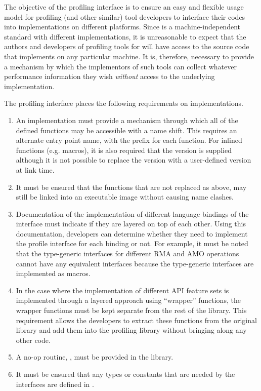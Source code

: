 The objective of the \openshmem profiling interface is to ensure an 
easy and flexible usage model for profiling (and other similar) 
tool developers to interface their codes into \openshmem 
implementations on different platforms. Since \openshmem is a 
machine-independent standard with different implementations, it is 
unreasonable to expect that the authors and developers of profiling 
tools for \openshmem will have access to the source code that 
implements \openshmem on any particular machine. It is, therefore,  
necessary to provide a mechanism by which the implementors of such 
tools can collect whatever performance information they wish 
\textit{without} access to the underlying implementation.

The \openshmem profiling interface places the following requirements 
on implementations. 

\begin{enumerate}
\item An \openshmem implementation must provide a mechanism through 
which all of the \openshmem defined functions may be accessible 
with a name shift. This requires an alternate 
entry point name, with the prefix  for each 
\openshmem function. For \openshmem inlined functions (e.g. macros), 
it is also required that the  version is supplied 
although it is not possible to replace the  version 
with a user-defined version at link time.
\item It must be ensured that the \openshmem functions that are not 
replaced as above, may still be linked into an executable image 
without causing name clashes. 
\item Documentation of the implementation of different language 
bindings of the \openshmem interface must indicate if they 
are layered on top of each other. Using this documentation,   
developers can determine whether they need to implement the 
profile interface for each binding or not. For example, it must 
be noted that the \openshmem \Cstd[11] type-generic interfaces for 
different RMA and AMO operations cannot have any equivalent 
 interfaces because the \Cstd[11] type-generic 
interfaces are implemented as macros.
\item In the case where the implementation of different API  
feature sets is implemented through a layered approach using 
``wrapper'' functions, the wrapper functions must be kept separate 
from the rest of the library. This requirement allows the developers 
to extract these functions from the original \openshmem library 
and add them into the profiling library without bringing along any 
other code.
\item A no-op routine, , must be provided 
in the \openshmem library.
\item It must be ensured that any \openshmem types or constants that are 
needed by the  interfaces are defined in .
\end{enumerate}

